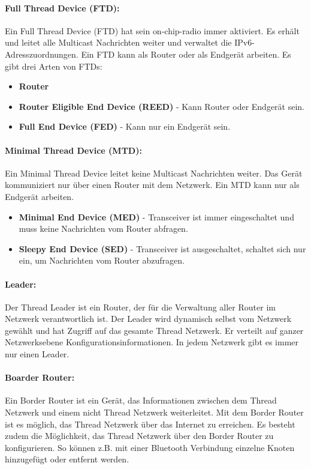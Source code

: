 \paragraph{Full Thread Device (FTD):}
Ein Full Thread Device (FTD) hat sein on-chip-radio immer aktiviert. Es erhält und leitet alle Multicast Nachrichten weiter und verwaltet die IPv6-Adresszuordnungen. Ein FTD kann als Router oder als Endgerät arbeiten. Es gibt drei Arten von FTDs: \cite[Seite 1-4]{thread_group_inc_thread_2017}

\begin{itemize}
	\item \textbf{Router}
	\item \textbf{Router Eligible End Device (REED)} - Kann Router oder Endgerät sein.
	\item \textbf{Full End Device (FED)} - Kann nur ein Endgerät sein.
\end{itemize}


\paragraph{Minimal Thread Device (MTD):}
Ein Minimal Thread Device leitet keine Multicast Nachrichten weiter. Das Gerät kommuniziert nur über einen Router mit dem Netzwerk. Ein MTD kann nur als Endgerät arbeiten. \cite[Seite 1-4]{thread_group_inc_thread_2017}

\begin{itemize}
	\item \textbf{Minimal End Device (MED)} - Transceiver ist immer eingeschaltet und muss keine Nachrichten vom Router abfragen. 
	\item \textbf{Sleepy End Device (SED)} - Transceiver ist ausgeschaltet, schaltet sich nur ein, um Nachrichten vom Router abzufragen.
\end{itemize}

\paragraph{Leader:}
Der Thread Leader ist ein Router, der für die Verwaltung aller Router im Netzwerk verantwortlich ist. Der Leader wird dynamisch selbst vom Netzwerk gewählt und hat Zugriff auf das gesamte Thread Netzwerk. Er verteilt auf ganzer Netzwerksebene Konfigurationsinformationen. In jedem Netzwerk gibt es immer nur einen Leader. \cite[Seite 1-4]{thread_group_inc_thread_2017}

\paragraph{Boarder Router:}
Ein Border Router ist ein Gerät, das Informationen zwischen dem Thread Netzwerk und einem nicht Thread Netzwerk weiterleitet. Mit dem Border Router ist es möglich, das Thread Netzwerk über das Internet zu erreichen. Es besteht zudem die Möglichkeit, das Thread Netzwerk über den Border Router zu konfigurieren. So können z.B. mit einer Bluetooth Verbindung einzelne Knoten hinzugefügt oder entfernt werden. \cite[Seite 1-4]{thread_group_inc_thread_2017}

